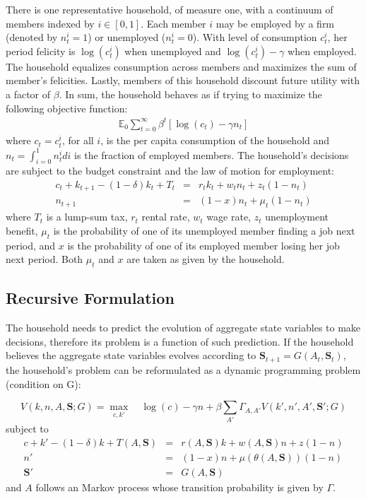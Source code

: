 \documentclass[12pt]{article}
\begin{document}
There is one representative household, of measure one, with a continuum of members indexed by $i \in [0,1] $. Each member $i$ may be employed by a firm (denoted by $n^{i}_{t}=1$) or unemployed ($n^{i}_{t}=0$). With level of consumption $c^{i}_{t}$, her period felicity is $\log(c_{t}^{i}) $ when unemployed and $\log(c_{t}^{i})-\gamma$ when employed. The household equalizes consumption across members and maximizes the sum of member's felicities. Lastly, members of this household discount future utility with a factor of $\beta$. In sum, the household behaves as if trying to maximize the following objective function:
\begin{eqnarray}
\mathbb{E}_{0} \sum_{t=0}^{\infty} \beta^{t} \left[ \log(c_{t}) - \gamma n_{t} \right]
\end{eqnarray}
\noindent where $c_{t}=c_{t}^{i}$, for all $i$, is the per capita consumption of the household and $n_{t}=\int_{i=0}^1n^{i}_tdi$ is the fraction of  employed members. The household's decisions are subject to the budget constraint and the law of motion for employment:
\begin{eqnarray}
c_{t} + k_{t+1} - (1-\delta)k_{t} + T_t &=& r_tk_{t} + w_tn_{t} + z_t (1-n_{t}) \\
n_{t+1} &=& (1-x)n_{t} + \mu_t(1-n_{t})
\end{eqnarray}
\noindent where $T_t$ is a lump-sum tax, $r_t$ rental rate, $w_t$ wage rate, $z_t$ unemployment benefit, $\mu_t$ is the probability of one of its unemployed member finding a job next period, and $x$ is the probability of one of its employed member losing her job next period. Both $\mu_t$ and $x$ are taken as given by the household.


\subsection{Recursive Formulation}
The household needs to predict the evolution of aggregate state variables to make decisions, therefore its problem is a function of such prediction. If the household believes the aggregate state variables evolves according to $\mathbf{S}_{t+1} = G(A_{t},\mathbf{S}_{t})$, the household's problem can be reformulated as a dynamic programming problem (condition on G):
	
	\begin{equation}
	V(k,n,A,\mathbf{S};G) = \max_{c,k'} \quad \log(c) - \gamma n+\beta \sum_{A'} \Gamma_{A,A'} V(k',n',A',\mathbf{S'};G)
	\end{equation}
	subject to
	\begin{eqnarray}
	c + k' - (1-\delta)k + T(A,\mathbf{S}) &=& r(A,\mathbf{S})k + w(A,\mathbf{S})n + z(1-n)  \\ 
	n' &=& (1-x)n + \mu(\theta(A,\mathbf{S}))(1-n)  \\
	\mathbf{S'} &=& G(A,\mathbf{S})
	\end{eqnarray}
	and $A$ follows an Markov process whose transition probability is given by $\Gamma$.
\end{document}
